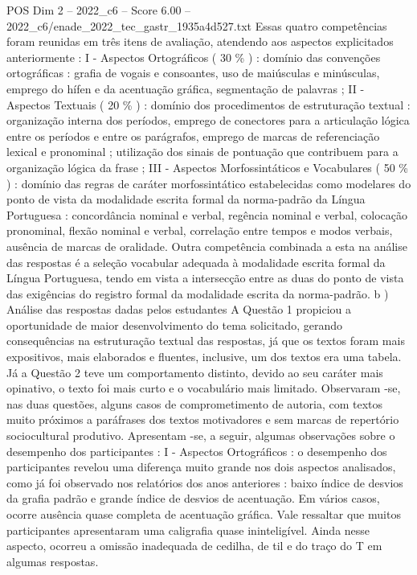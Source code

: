 \begin{textsample}{POS Dim 2 – 2022\_c6 – Score 6.00 – 2022\_c6/enade\_2022\_tec\_gastr\_1935a4d527.txt}
Essas quatro competências foram reunidas em três itens de avaliação, atendendo aos aspectos explicitados anteriormente : I - Aspectos Ortográficos ( 30 \% ) : domínio das convenções ortográficas : grafia de vogais e consoantes, uso de maiúsculas e minúsculas, emprego do hífen e da acentuação gráfica, segmentação de palavras ; II - Aspectos Textuais ( 20 \% ) : domínio dos procedimentos de estruturação textual : organização interna dos períodos, emprego de conectores para a articulação lógica entre os períodos e entre os parágrafos, emprego de marcas de referenciação lexical e pronominal ; utilização dos sinais de pontuação que contribuem para a organização lógica da frase ; III - Aspectos Morfossintáticos e Vocabulares ( 50 \% ) : domínio das regras de caráter morfossintático estabelecidas como modelares do ponto de vista da modalidade escrita formal da norma-padrão da Língua Portuguesa : concordância nominal e verbal, regência nominal e verbal, colocação pronominal, flexão nominal e verbal, correlação entre tempos e modos verbais, ausência de marcas de oralidade.
Outra competência combinada a esta na análise das respostas é a seleção vocabular adequada à modalidade escrita formal da Língua Portuguesa, tendo em vista a intersecção entre as duas do ponto de vista das exigências do registro formal da modalidade escrita da norma-padrão. b ) Análise das respostas dadas pelos estudantes A Questão 1 propiciou a oportunidade de maior desenvolvimento do tema solicitado, gerando consequências na estruturação textual das respostas, já que os textos foram mais expositivos, mais elaborados e fluentes, inclusive, um dos textos era uma tabela.
Já a Questão 2 teve um comportamento distinto, devido ao seu caráter mais opinativo, o texto foi mais curto e o vocabulário mais limitado.
Observaram -se, nas duas questões, alguns casos de comprometimento de autoria, com textos muito próximos a paráfrases dos textos motivadores e sem marcas de repertório sociocultural produtivo.
Apresentam -se, a seguir, algumas observações sobre o desempenho dos participantes : I - Aspectos Ortográficos : o desempenho dos participantes revelou uma diferença muito grande nos dois aspectos analisados, como já foi observado nos relatórios dos anos anteriores : baixo índice de desvios da grafia padrão e grande índice de desvios de acentuação.
Em vários casos, ocorre ausência quase completa de acentuação gráfica.
Vale ressaltar que muitos participantes apresentaram uma caligrafia quase ininteligível.
Ainda nesse aspecto, ocorreu a omissão inadequada de cedilha, de til e do traço do T em algumas respostas.

\end{textsample}
